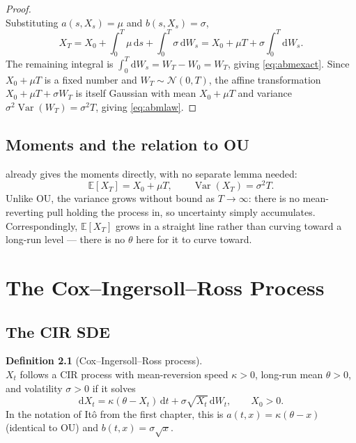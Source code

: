\documentclass[11pt]{report}
\newcommand{\E}{\mathbb{E}}
\newcommand{\Var}{\operatorname{Var}}
\newcommand{\dd}{\mathrm{d}}
\newcommand{\dW}{\dd W_t}
\newcommand{\dt}{\dd t}
\newcommand{\drift}{a}
\newcommand{\diff}{b}
\theoremstyle{plain}
\theoremstyle{definition}
\newtheorem{definition}{Definition}[chapter]
\theoremstyle{remark}
\numberwithin{equation}{chapter}
\begin{document}
\begin{proof}
  \leavevmode\\
Substituting $\drift(s,X_s)=\mu$ and $\diff(s,X_s)=\sigma$,
\[
   X_T = X_0 + \int_0^T \mu\,\dd s + \int_0^T \sigma\,\dd W_s
       = X_0 + \mu T + \sigma\int_0^T \dd W_s .
\]
The remaining integral is $\int_0^T \dd W_s = W_T - W_0 = W_T$,
giving \eqref{eq:abmexact}. Since $X_0+\mu T$ is a fixed number and
$W_T\sim\mathcal N(0,T)$, the affine transformation
$X_0+\mu T+\sigma W_T$ is itself Gaussian with mean $X_0+\mu T$ and
variance $\sigma^2\Var(W_T)=\sigma^2 T$, giving \eqref{eq:abmlaw}.
\end{proof}


\section{Moments and the relation to OU}

 already gives the moments directly, with no
separate lemma needed:
\[
   \E[X_T] = X_0+\mu T, \qquad \Var(X_T) = \sigma^2 T.
\]
Unlike OU, the variance grows without bound as $T\to\infty$: there is
no mean-reverting pull holding the process in, so uncertainty simply
accumulates. Correspondingly, $\E[X_T]$ grows in a straight line
rather than curving toward a long-run level --- there is no $\theta$
here for it to curve toward.


\chapter{The Cox--Ingersoll--Ross Process}
\section{The CIR SDE}

\begin{definition}[Cox--Ingersoll--Ross process]\label{def:cir}
  \leavevmode\\
$X_t$ follows a CIR process with mean-reversion speed $\kappa>0$,
long-run mean $\theta>0$, and volatility $\sigma>0$ if it solves
\begin{equation}\label{eq:cirsde}
   \dd X_t = \kappa(\theta - X_t)\,\dt + \sigma\sqrt{X_t}\,\dW,
   \qquad X_0>0.
\end{equation}
In the notation of It\^o from the first chapter, this is
$\drift(t,x)=\kappa(\theta-x)$ (identical to OU) and
$\diff(t,x)=\sigma\sqrt{x}$.
\end{definition}
\end{document}
